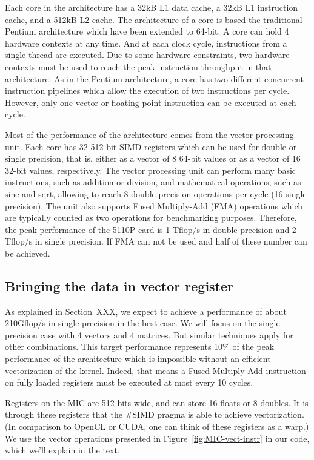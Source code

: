 \documentclass[10pt,conference,compsocconf]{IEEEtran}
\begin{document}
Each core in the architecture has a 32kB L1 data cache, a 32kB L1
instruction cache, and a 512kB L2 cache. The architecture of a core is
based the traditional Pentium architecture which have been extended to
64-bit. A core can hold 4 hardware contexts at any time. And at each
clock cycle, instructions from a single thread are executed. Due to
some hardware constraints, two hardware contexts must be used to reach
the peak instruction throughput in that architecture. As in the
Pentium architecture, a core has two different concurrent instruction
pipelines which allow the execution of two instructions per
cycle. However, only one vector or floating point instruction can be
executed at each cycle.

Most of the performance of the architecture comes from the vector
processing unit. Each core has 32 512-bit SIMD registers which can be
used for double or single precision, that is, either as a vector of 8
64-bit values or as a vector of 16 32-bit values, respectively. The
vector processing unit can perform many basic instructions, such as
addition or division, and mathematical operations, such as sine and
sqrt, allowing to reach 8 double precision operations per cycle (16
single precision). The unit also supports Fused Multiply-Add (FMA)
operations which are typically counted as two operations for
benchmarking purposes. Therefore, the peak performance of the 5110P
card is 1 Tflop/s in double precision and 2 Tflop/s in single
precision. If FMA can not be used and half of these number can be
achieved.


\subsection{Bringing the data in vector register}

As explained in Section~XXX, we expect to achieve a performance of
about 210Gflop/s in single precision in the best case. We will focus
on the single precision case with 4 vectors and 4 matrices. But
similar techniques apply for other combinations. This target
performance represents 10\% of the peak performance of the
architecture which is impossible without an efficient vectorization of
the kernel. Indeed, that means a Fused Multiply-Add instruction on  
fully loaded registers must be executed at most every 10 cycles.

Registers on the MIC are 512 bits wide, and can store 16 floats or 8
doubles. It is through these registers that the \#SIMD pragma is able
to achieve vectorization. (In comparison to OpenCL or CUDA, one can
think of these registers as a warp.)  We use the vector operations
presented in Figure~\ref{fig:MIC-vect-instr} in our code, which we'll
explain in the text.
\end{document}
